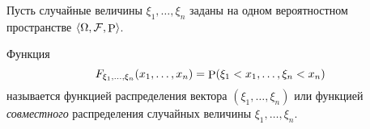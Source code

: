 Пусть случайные величины $\xi_1, \ldots, \xi_n$ заданы на одном вероятностном пространстве $\langle \Omega, \mathcal F, \P\rangle$.

\begin{to_def}
    Функция
    \begin{equation}
        F_{\xi_1, \ldots, \xi_n} (x_1, \ldots, x_n) = \P(
            \xi_1 < x_1, \ldots, \xi_n < x_n
        )
    \end{equation}
    называется функцией распределения вектора $(\xi_1, \ldots, \xi_n)$ или функцией \textit{совместного} распределения случайных величины $\xi_1, \ldots, \xi_n$.
\end{to_def}
